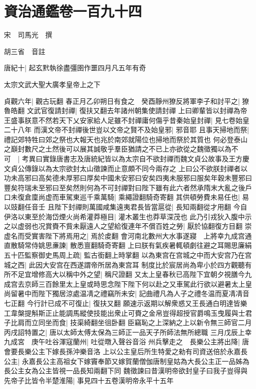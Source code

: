 \chapter{資治通鑑卷一百九十四}
宋　司馬光　撰

胡三省　音註

唐紀十|{
	起玄黓執徐盡彊圉作噩四月凡五年有奇}


太宗文武大聖大廣孝皇帝上之下

貞觀六年|{
	觀古玩翻}
春正月乙卯朔日有食之　癸酉靜州獠反將軍李子和討平之|{
	獠魯皓翻}
文武官復請封禪|{
	復扶又翻去年諸州朝集使請封禪}
上曰卿輩皆以封禪為帝王盛事朕意不然若天下乂安家給人足雖不封禪庸何傷乎昔秦始皇封禪|{
	見七卷始皇二十八年}
而漢文帝不封禪後世豈以文帝之賢不及始皇邪|{
	邪音耶}
且事天掃地而祭|{
	禮記郊特牲曰郊之祭也大報天也兆於南郊就陽位也掃地而祭於其質也}
何必登泰山之巔封數尺之土然後可以展其誠敬乎羣臣猶請之不已上亦欲從之魏徵獨以為不可　|{
	考異曰實錄唐書志及唐統紀皆以為太宗自不欲封禪而魏文貞公故事及王方慶文貞公傳錄以為太宗欲封太山徵諫而止意頗不同今兩存之}
上曰公不欲朕封禪者以功未高邪曰高矣德未厚邪曰厚矣中國未安邪曰安矣四夷未服邪曰服矣年穀未豐邪曰豐矣符瑞未至邪曰至矣然則何為不可封禪對曰陛下雖有此六者然承隋末大亂之後戶口未復倉廩尚虚而車駕東巡千乘萬騎|{
	乘繩證翻騎奇寄翻}
其供頓勞費未易任也|{
	易以豉翻任音壬}
且陛下封禪則萬國咸集遠夷君長皆當扈從|{
	長知兩翻從才用翻}
今自伊洛以東至於海岱煙火尚希灌莽極目|{
	灌木叢生也莽草深茂也}
此乃引戎狄入腹中示之以虚弱也况賞賚不貲未厭遠人之望給復連年不償百姓之勞|{
	厭於協翻復方目翻}
崇虚名而受實害陛下將焉用之|{
	焉於䖍翻}
會河南北數州大水事遂寢　上將幸九成宫通直散騎常侍姚思亷諫|{
	散悉亶翻騎奇寄翻}
上曰朕有氣疾暑輒頓劇往避之耳賜思廉絹五十匹監察御史馬周上疏|{
	監古銜翻上時掌翻}
以為東宫在宫城之中而大安宫乃在宫城之西|{
	此因大安宫在西遂謂帝所居為東宫耳}
制度比於宸居尚為卑小於四方觀聽有所不足宜增修高大以稱中外之望|{
	稱尺證翻}
又太上皇春秋已高陛下宜朝夕視膳今九成宫去京師三百餘里太上皇或時思念陛下陛下何以赴之又車駕此行欲以避暑太上皇尚留暑中而陛下獨居涼處温凊之禮竊所未安|{
	記曲禮凡為人子之禮冬温而夏凊凊音七正翻}
今行計已成不可復止|{
	復扶又翻}
願速示返期以解衆惑又王長通白明達皆樂工韋槃提斛斯正止能調馬縱使技能出衆止可賚之金帛豈得超授官爵鳴玉曳履與士君子比肩而立同坐而食|{
	技渠綺翻坐徂卧翻}
臣竊恥之上深納之上以新令無三師官二月丙戌詔特置之|{
	唐以太師太傅太保為三師正一品天子所師法無所總職}
三月戊辰上幸九成宮　庚午吐谷渾寇蘭州|{
	吐從暾入聲谷音浴}
州兵擊走之　長樂公主將出降|{
	唐會要長樂公主下嫁長孫沖樂音洛}
上以公主皇后所生特愛之勑有司資送倍於永嘉長公主|{
	永嘉長公主高祖女下嫁竇奉節又嫁賀蘭僧伽唐制皇姑為大長公主正一品姊為長公主女為公主皆視一品長知兩翻下同}
魏徵諫曰昔漢明帝欲封皇子曰我子豈得與先帝子比皆令半楚淮陽|{
	事見四十五卷漢明帝永平十五年}
